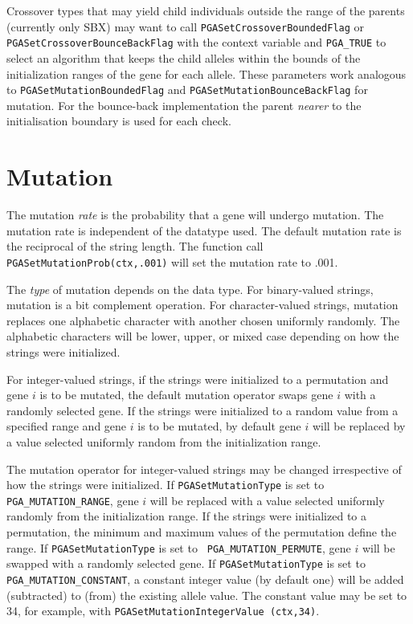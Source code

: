 \documentclass{report}
\begin{document}
Crossover types that may yield child individuals outside the range of
the parents (currently only SBX) may want to call
\verb+PGASetCrossoverBoundedFlag+ or \verb+PGASetCrossoverBounceBackFlag+
with the context variable and \verb+PGA_TRUE+ to select an algorithm
that keeps the child alleles within the bounds of the initialization
ranges of the gene for each allele. These parameters work analogous to
\verb+PGASetMutationBoundedFlag+ and \verb+PGASetMutationBounceBackFlag+
for mutation. For the bounce-back implementation the parent
\textit{nearer} to the initialisation boundary is used for each check.


\section{Mutation}\label{sec:mutation}

The mutation {\em rate} is the probability that a gene will undergo
mutation.  The mutation rate is independent of the datatype used. The default
mutation rate is the reciprocal of the string length.  The function call {\tt
PGASetMutationProb(ctx,.001)} will set the mutation rate to .001.

The {\em type} of mutation depends on the data type.  For binary-valued
strings, mutation is a bit complement operation. For
character-valued strings, mutation replaces one alphabetic character with
another chosen uniformly randomly.  The alphabetic characters will be lower,
upper, or mixed case depending on how the strings were initialized.

For integer-valued strings, if the strings were initialized to a permutation
and gene $i$ is to be mutated, the default mutation operator swaps gene $i$
with a randomly selected gene. If the strings were initialized to a random
value from a specified range and gene $i$ is to be mutated, by default gene
$i$ will be replaced by a value selected uniformly random from the
initialization range.

The mutation operator for integer-valued strings may be changed irrespective
of how the strings were initialized.  If {\tt PGASetMutationType} is set to
{\tt PGA\_MUTATION\_RANGE}, gene $i$ will be replaced with a value selected
uniformly randomly from the initialization range.  If the strings were
initialized to a permutation, the minimum and maximum values of the
permutation define the range.  If {\tt PGASetMutationType} is set to {\tt
PGA\_MUTATION\_PERMUTE}, gene $i$ will be swapped with a randomly selected
gene.  If {\tt PGASetMutationType} is set to {\tt PGA\_MUTATION\_CONSTANT}, a
constant integer value (by default one) will be added (subtracted) to (from)
the existing allele value.  The constant value may be set to 34, for example,
with {\tt PGASetMutationIntegerValue (ctx,34)}.
\end{document}
